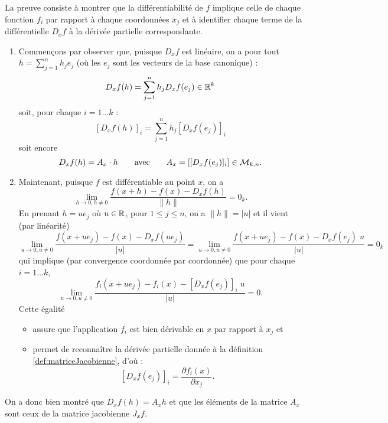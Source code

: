 \proof
La preuve consiste à montrer que la différentiabilité de $f$ implique celle de chaque fonction $f_i$ par rapport à chaque coordonnées $x_j$ et à identifier chaque terme de la différentielle $D_xf$ à la dérivée partielle correspondante. 
\begin{enumerate}
  \item Commençons par observer que, puisque $D_x f$ est linéaire, on a pour tout $h = \sum_{j=1}^n h_j e_j$ (où les $e_j$ sont les vecteurs de la base canonique) :
  $$
  D_xf(h) = \sum_{j=1}^n h_j D_xf(e_j) \in \mathbb{R}^k
  $$
  soit, pour chaque $i = 1 \dots k$ :
  $$
  [D_xf(h)]_i = \sum_{j=1}^n h_j [D_xf(e_j)]_i
  $$
  soit encore
  $$
  D_xf(h) = A_x \cdot h
  \qquad \text{avec} \qquad
  A_x = \left[ [D_xf(e_j)]_i \right] \in \mathcal{M}_{k, n}.
  $$
  \item Maintenant, puisque $f$ est différentiable au point $x$, on a 
  $$
  \lim_{h\to 0, h \neq 0} \frac{f(x+h) - f(x) - D_xf(h)}{\|h\|} = 0_k.
  $$
  En prenant $h = u e_j$ où $u \in \mathbb{R}$, pour $1 \leq j \leq n$, on a $\|h\| = |u|$ et il vient (par linéarité)
  $$
  \lim_{u\to 0, u \neq 0} \frac{f(x+u e_j) - f(x) - D_xf(u e_j)}{|u|} 
  = \lim_{u\to 0, u \neq 0} \frac{f(x+u e_j) - f(x) - D_xf(e_j) \; u}{|u|} 
  =  0_k
  $$
  qui implique (par convergence coordonnée par coordonnée) que pour chaque $i = 1 \dots k$, 
  $$
  \lim_{u\to 0, u \neq 0} \frac{f_i(x+u e_j) - f_i(x) - [D_xf(e_j)]_i \; u}{|u|} 
  = 0.
  $$
  Cette égalité 
  \begin{itemize}
   \item assure que l'application $f_i$ est bien dérivable en $x$ par rapport à $x_j$ et 
   \item permet de reconnaître la dérivée partielle donnée à la définition \ref{def:matriceJacobienne}, d'où : 
   $$
   [D_xf(e_j)]_i = \frac{\partial f_i(x)}{\partial x_j}.
   $$
  \end{itemize}
\end{enumerate}
On a donc bien montré que $D_xf(h) = A_x h$ et que les éléments de la matrice $A_x$ sont ceux de la matrice jacobienne $J_xf$.
\eproof


